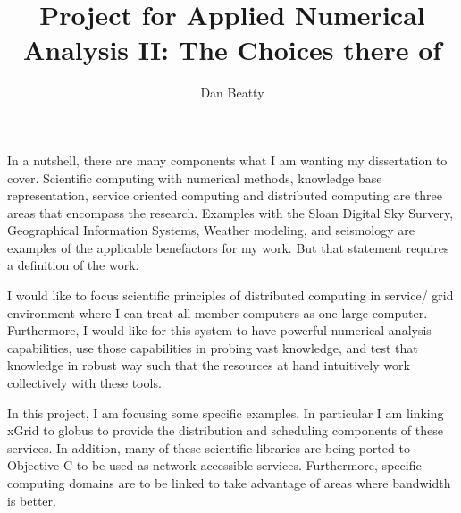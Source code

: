 \documentclass[11pt]{article}
\title{Project for Applied Numerical Analysis II: The Choices there of}
\author{Dan Beatty}
\begin{document}
\maketitle

In a nutshell, there are many components what I am wanting my dissertation to cover.  Scientific computing with numerical methods, knowledge base representation, service oriented computing and distributed computing are three areas that encompass the research.  Examples with the Sloan Digital Sky Survery, Geographical Information Systems, Weather modeling, and seismology are examples of the applicable benefactors for my work.  But that statement requires a definition of the work.  

I would like to focus scientific principles of distributed computing in service/ grid environment where I can treat all member computers as one large computer.   Furthermore, I would like for this system to have powerful numerical analysis capabilities, use those capabilities in probing vast knowledge, and test that knowledge in robust way such that the resources at hand intuitively work collectively with these tools.  

In this project, I am focusing some specific examples.   In particular I am linking xGrid to globus to provide the distribution and scheduling components of these services.  In addition, many of these scientific libraries are being ported to Objective-C to be used as network accessible services.   Furthermore, specific computing domains are to be linked to take advantage of areas where bandwidth is better.   



 
\end{document}
